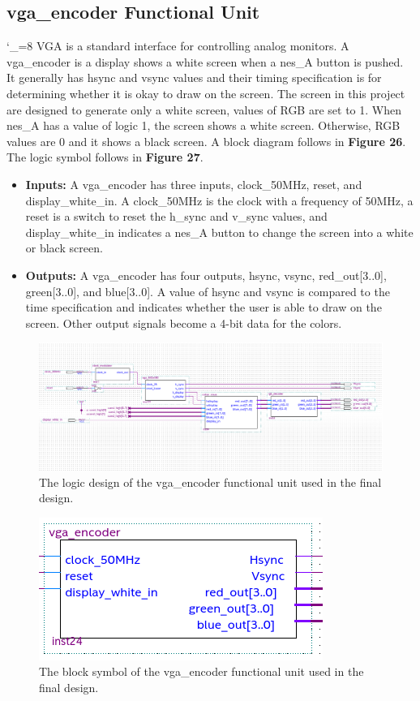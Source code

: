 \documentclass[a4paper]{article}
\begin{document}
\subsection{vga\_encoder Functional Unit}
\catcode`_=8
VGA is a standard interface for controlling analog monitors. A vga\_encoder is a display shows a white screen when a nes\_A button is pushed. It generally has hsync and vsync values and their timing specification is for determining whether it is okay to draw on the screen. The screen in this project are designed to generate only a white screen, values of RGB are set to 1. When nes\_A has a value of logic 1, the screen shows a white screen. Otherwise, RGB values are 0 and it shows a black screen. A block diagram follows in \textbf{Figure 26}.  The logic symbol follows in \textbf{Figure 27}.
\begin{itemize}
\item \textbf{Inputs:  } A vga\_encoder has three inputs, clock\_50MHz, reset, and display\_white\_in. A clock\_50MHz is the clock with a frequency of 50MHz, a reset is a switch to reset the h\_sync and v\_sync values, and display\_white\_in indicates a nes\_A button to change the screen into a white or black screen.
\item \textbf{Outputs: } A vga\_encoder has four outputs, hsync, vsync, red\_out[3..0], green[3..0], and blue[3..0]. A value of hsync and vsync is compared to the time specification and indicates whether the user is able to draw on the screen. Other output signals become a 4-bit data for the colors.
\end{itemize}
\begin{figure}[h]
\centering
\includegraphics[width=.98\textwidth]{functional_units/vga_encoder/vga_encoder_block.png}
\caption{The logic design of the vga\_encoder functional unit used in the final design.}
\end{figure}
\begin{figure}[h]
\centering
\includegraphics[width=.48\textwidth]{functional_units/vga_encoder/vga_encoder_symbol.png}
\caption{The block symbol of the vga\_encoder functional unit used in the final design.}
\end{figure}
\end{document}
